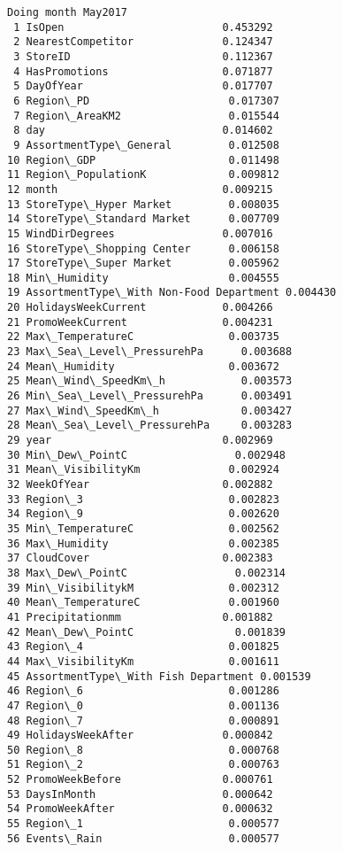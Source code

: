 \documentclass[11pt]{article}
\begin{document}
    \begin{Verbatim}[commandchars=\\\{\}]
Doing month May2017
 1 IsOpen                         0.453292
 2 NearestCompetitor              0.124347
 3 StoreID                        0.112367
 4 HasPromotions                  0.071877
 5 DayOfYear                      0.017707
 6 Region\_PD                      0.017307
 7 Region\_AreaKM2                 0.015544
 8 day                            0.014602
 9 AssortmentType\_General         0.012508
10 Region\_GDP                     0.011498
11 Region\_PopulationK             0.009812
12 month                          0.009215
13 StoreType\_Hyper Market         0.008035
14 StoreType\_Standard Market      0.007709
15 WindDirDegrees                 0.007016
16 StoreType\_Shopping Center      0.006158
17 StoreType\_Super Market         0.005962
18 Min\_Humidity                   0.004555
19 AssortmentType\_With Non-Food Department 0.004430
20 HolidaysWeekCurrent            0.004266
21 PromoWeekCurrent               0.004231
22 Max\_TemperatureC               0.003735
23 Max\_Sea\_Level\_PressurehPa      0.003688
24 Mean\_Humidity                  0.003672
25 Mean\_Wind\_SpeedKm\_h            0.003573
26 Min\_Sea\_Level\_PressurehPa      0.003491
27 Max\_Wind\_SpeedKm\_h             0.003427
28 Mean\_Sea\_Level\_PressurehPa     0.003283
29 year                           0.002969
30 Min\_Dew\_PointC                 0.002948
31 Mean\_VisibilityKm              0.002924
32 WeekOfYear                     0.002882
33 Region\_3                       0.002823
34 Region\_9                       0.002620
35 Min\_TemperatureC               0.002562
36 Max\_Humidity                   0.002385
37 CloudCover                     0.002383
38 Max\_Dew\_PointC                 0.002314
39 Min\_VisibilitykM               0.002312
40 Mean\_TemperatureC              0.001960
41 Precipitationmm                0.001882
42 Mean\_Dew\_PointC                0.001839
43 Region\_4                       0.001825
44 Max\_VisibilityKm               0.001611
45 AssortmentType\_With Fish Department 0.001539
46 Region\_6                       0.001286
47 Region\_0                       0.001136
48 Region\_7                       0.000891
49 HolidaysWeekAfter              0.000842
50 Region\_8                       0.000768
51 Region\_2                       0.000763
52 PromoWeekBefore                0.000761
53 DaysInMonth                    0.000642
54 PromoWeekAfter                 0.000632
55 Region\_1                       0.000577
56 Events\_Rain                    0.000577

\end{Verbatim}
\end{document}
